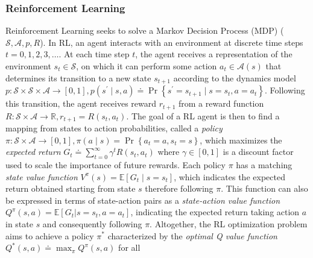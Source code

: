 \subsubsection{Reinforcement Learning}\label{sec:RL_BG}
Reinforcement Learning seeks to solve a Markov Decision Process
(MDP) ($\mathcal{S},\mathcal{A},p,R$). In
RL, an agent interacts with an environment at
discrete time steps $t=0,1,2,3,\ldots$. At each time step $t$, the
agent receives a representation of the environment $s_t \in
\mathcal{S}$, on which it can perform some action $a_t \in
\mathcal{A}(s)$ that determines its transition to a new state
$s_{t+1}$ according to the dynamics model
$p\colon\mathcal{S}\times\mathcal{S}\times\mathcal{A}\rightarrow
\left[0,1\right],p\left(s^\prime\mid
  s,a\right)\doteq\Pr\left\{s^\prime=s_{t+1}\mid
  s=s_t,a=a_t\right\}$. Following this transition, the agent receives
reward $r_{t+1}$ from a reward function
$R\colon\mathcal{S}\times\mathcal{A}\rightarrow\mathbb{R},
r_{t+1}=R\left(s_t,a_t\right)$. The goal of a RL agent is then to find
a mapping from states to action probabilities, called a \textit{policy}
$\pi\colon\mathcal{S}\times\mathcal{A}\rightarrow\left[0,1\right],
\pi\left(a\mid s\right)=\Pr\left\{a_t=a,s_t=s\right\}$, which
maximizes the \textit{expected return} $G_t\doteq
\sum_{t=0}^{\infty}\gamma^{t}R\left(s_t,a_t\right)$ where
$\gamma\in\left[0,1\right]$ is a discount factor used to scale the
importance of future rewards. Each policy $\pi$ has a matching
\textit{state value function}
$V^{\pi}\left(s\right)=\mathbb{E}\left[G_t\mid s=s_t\right]$, which
indicates the expected return obtained starting from state $s$ therefore
following $\pi$. This function can also be expressed in terms of
state-action pairs as a \textit{state-action value function}
$Q^{\pi}\left(s,a\right)=\mathbb{E}\left[G_t|s=s_t,a=a_t\right]$,
indicating the expected return taking action $a$ in state $s$ and
consequently following $\pi$. Altogether, the RL optimization problem aims
to achieve a policy $\pi^*$ characterized by the \textit{optimal Q
  value function}
$Q^*\left(s,a\right)\doteq\max_{\pi}Q^{\pi}\left(s,a\right)$ for all
